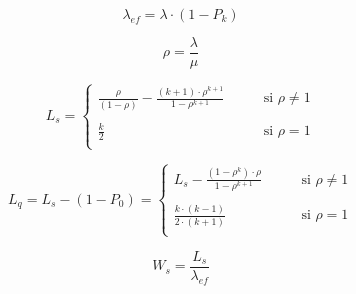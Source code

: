 \documentclass{templateNote}
\newcommand{\newparagraph}{\par\vspace{\baselineskip}\noindent}
\begin{document}
\newpage
\begin{tcolorbox}[
    colframe=black!100, %
    colback=white!100,       %
    coltitle=white!100, %
    title=\textbf{M/M/1/K}, %
]
    \begin{minipage}{0.2\textwidth}
        \begin{equation*}
            \lambda_{ef} = \lambda \cdot (1 - P_k)
        \end{equation*}
    \end{minipage}
    \hfill
    \begin{minipage}{0.1\textwidth}
        \begin{equation*}
            \rho = \frac{\lambda}{\mu}
        \end{equation*}
    \end{minipage}
    \hfill
    \begin{minipage}{0.6\textwidth}
        \begin{equation*}
            L_s = \begin{cases}
                \displaystyle\frac{\rho}{(1 - \rho)} - \frac{(k + 1)\cdot \rho^{k+1}}{1 - \rho^{k+1}} & \qquad \text{si } \rho \neq 1 \\
                \\
                \displaystyle\frac{k}{2} & \qquad \text{si } \rho = 1 \\
            \end{cases}
        \end{equation*}
    \end{minipage}
    \newparagraph
    \begin{minipage}{0.7\textwidth}
        \begin{equation*}
            L_q = L_s - (1 - P_0) = \begin{cases}
                \displaystyle L_s - \frac{(1 - \rho^k) \cdot \rho}{1 - \rho^{k + 1}} & \qquad \text{si } \rho \neq 1 \\
                \\
                \displaystyle \frac{k \cdot (k - 1)}{2 \cdot (k + 1)} & \qquad \text{si } \rho = 1 \\
            \end{cases}
        \end{equation*}
    \end{minipage}
    \hfill
    \begin{minipage}{0.2\textwidth}
        \begin{equation*}
            W_s = \frac{L_s}{\lambda_{ef}}

\end{equation*}
\end{minipage}
\end{tcolorbox}
\end{document}
